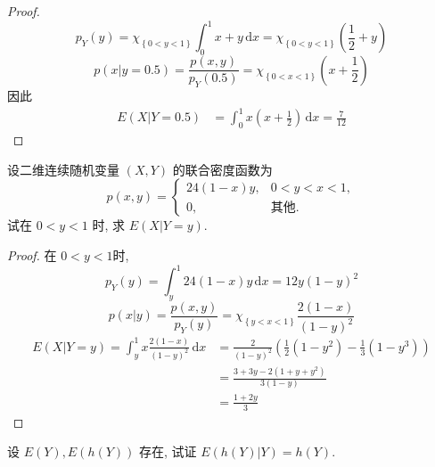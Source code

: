 \documentclass[../main.tex]{subfiles}
\begin{document}
\begin{proof}
     \[
     p_{Y}\left( y \right)= \chi _{\left\{ 0< y< 1 \right\}}\int_{0}^{1}x+ y\,\mathrm{d} x= \chi _{\left\{ 0< y< 1 \right\}}\left( \frac{1}{2}+ y \right)  
     \] \[
     p\left( x|y= 0.5 \right)= \frac{p\left( x,y \right)  }{p_{Y}\left( 0.5 \right)  }= \chi _{\left\{ 0< x<  1 \right\}}\left( x+ \frac{1}{2} \right) 
     \]因此 \[
     \begin{aligned}
     E\left( X|Y= 0.5 \right)&= \int_{0}^{1}x\left( x+ \frac{1}{2} \right)\,\mathrm{d} x= \frac{7}{12}
     \end{aligned}
     \]
\end{proof}
\begin{exercise}{}{}
设二维连续随机变量 $(X, Y)$ 的联合密度函数为
\[
p(x, y) = \begin{cases} 24(1-x)y, & 0 < y < x < 1, \\ 0, & \text{其他}. \end{cases}
\]
试在 $0 < y < 1$ 时, 求 $E(X|Y=y)$.
\end{exercise}
\begin{proof}
    在 \(  0< y< 1  \)时, 
     \[
     p_{Y}\left( y \right) = \int_{y}^{1}24\left( 1-x \right)y\,\mathrm{d} x= 12y \left( 1-y \right)^{2}  
     \] \[
     p\left( x|y \right)= \frac{p\left( x,y \right)  }{p_{Y}\left( y \right)  }= \chi _{\left\{ y< x< 1 \right\}}\frac{2\left( 1-x \right) }{\left( 1-y \right)^{2}  }   
     \] \[
    \begin{aligned}
     E\left( X|Y= y \right)= \int_{y}^{1}x\frac{2\left( 1-x \right)  }{\left( 1-y \right)^{2}  }\,\mathrm{d} x&= \frac{2 }{\left( 1-y \right)^{2}  } \left( \frac{1}{2}\left( 1-y^{2} \right)-\frac{1}{3}\left( 1-y^{3} \right)   \right)  \\ 
      &= \frac{ 3+ 3y -2\left( 1+ y+ y^{2} \right) }{3\left( 1-y \right)  }\\ 
       &= \frac{1+ 2y }{3 }  
    \end{aligned}
     \]
\end{proof}
\begin{exercise}{}{}
    设 $E(Y), E(h(Y))$ 存在, 试证 $E(h(Y)|Y) = h(Y)$.
\end{exercise}
\end{document}
